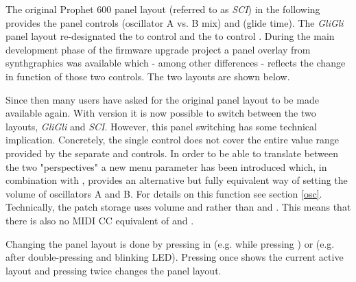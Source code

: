 The original Prophet 600 panel layout (referred to as \textit{SCI}) in the following provides the panel controls \mixer (oscillator A vs. B mix) and \glidepot (glide time). The \textit{GliGli} panel layout re-designated the \mixer to control \vola and the \glidepot to control \volb. During the main development phase of the firmware upgrade project a panel overlay from synthgraphics \cite{synthgraphics} was available which - among other differences - reflects the change in function of those two controls. The two layouts are shown below. 


Since then many users have asked for the original panel layout to be made available again. With version \version it is now possible to switch between the two layouts, \textit{GliGli} and \textit{SCI}. However, this panel switching has some technical implication. Concretely, the single \mixer control does not cover the entire value range provided by the separate \vola and \volb controls. In order to be able to translate between the two "perspectives" a new menu parameter \drive has been introduced which, in combination with \mixer, provides an alternative but fully equivalent way of setting the volume of oscillators A and B. For details on this function see section \ref{osc}. Technically, the patch storage uses volume \vola and \volb rather than \mixer and \drive. This means that there is also no MIDI CC equivalent of \mixer and \drive.

Changing the panel layout is done by pressing  in \shiftmode (e.g. while pressing \fromtape) or \shiftlock (e.g. after double-pressing \fromtape and blinking \fromtape LED). Pressing  once shows the current active layout and pressing  twice changes the panel layout. 


